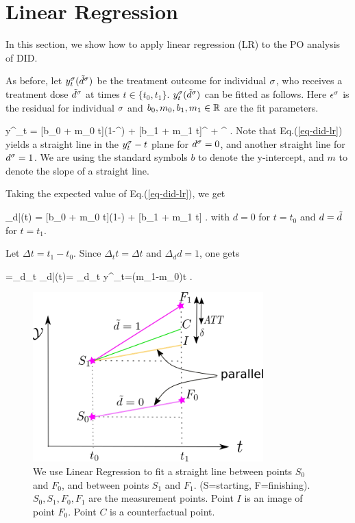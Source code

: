 \section{Linear Regression}
In this
section,
we show how to apply
linear regression (LR)
to the PO analysis of DID.


As before, let
$y^\sigma_t({\tilde{d}}^\sigma)$ be the treatment outcome
for individual $\sigma$,
who receives
a treatment dose
${\tilde{d}}^\sigma$
at times $t\in\{t_0, t_1\}$.
$y^\sigma_t({\tilde{d}}^\sigma)$
can be fitted as follows.
Here $\epsilon^\sigma$
is the residual
for individual $\sigma$
and $b_0, m_0, b_1, m_1\in { \mathbb{R}}$
are the fit parameters.

%
\beq
y^\s_t = [b_0 + m_0 t](1-\td^\s)
+  [b_1 + m_1 t]\td^\s
+ \eps^\s
\;.
\label{eq-did-lr}
\eeq  
Note that Eq.(\ref{eq-did-lr})
 yields a straight line
in the $y^\sigma_t-t$ plane
for $d^\sigma=0$,
and another 
straight line for $d^\sigma=1$.
We are
using the
standard symbols
$b$ to denote
the y-intercept, and $m$ 
to denote the slope
of a straight line.

Taking the expected value
of Eq.(\ref{eq-did-lr}), we get

\beq
\caly_{d|\td}(t) = 
[b_0 + m_0 t](1-\td)
+  [b_1 + m_1 t]\td
\;.
\eeq  
with $d=0$ for $t=t_0$
and $d={\tilde{d}}$ for $t=t_1$.

Let $\Delta t=t_1-t_0$. Since
$\Delta_t t=\Delta t$ and $\Delta_d d=1$, one gets

\beq
\delta=\Delta_d\Delta_t \calm\caly_{d|\td}(t)=
\Delta_d\Delta_t y^\s_t=(m_1-m_0)\Delta t
\;.
\eeq



\begin{figure}[h!]
\centering
\includegraphics[width=3.5in]
{did/parallel-trends.png}
\caption{We use
Linear Regression
to fit a straight line
between points $S_0$
and $F_0$,
and between points
$S_1$ and $F_1$.
(S=starting, F=finishing).
$S_0, S_1, F_0, F_1$ are the measurement points.
Point
$I$ is an image of point $F_0$.
Point $C$ is a counterfactual point.
} 
\label{fig-parallel-trends}
\end{figure}

